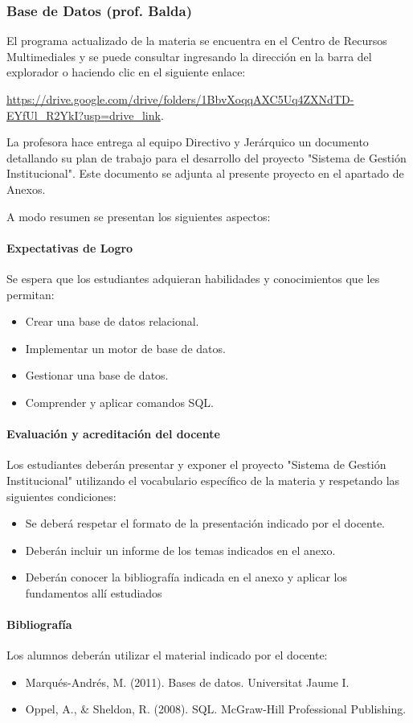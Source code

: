 \subsubsection{Base de Datos (prof. Balda)}       

El programa actualizado de la materia se encuentra en el Centro de Recursos Multimediales y se puede consultar ingresando la dirección en la barra del explorador o haciendo clic en el siguiente enlace:

\url{https://drive.google.com/drive/folders/1BbvXoqqAXC5Uq4ZXNdTD-EYfUl_R2YkI?usp=drive_link}.

La profesora hace entrega al equipo Directivo y Jerárquico un documento detallando su plan de trabajo para el desarrollo del proyecto "Sistema de Gestión Institucional". Este documento se adjunta al presente proyecto en el apartado de Anexos.

A modo resumen se presentan los siguientes aspectos:
\paragraph{Expectativas de Logro}
Se espera que los estudiantes adquieran habilidades y conocimientos que les permitan: 
\begin{itemize}
    \item Crear una base de datos relacional.
    \item Implementar un motor de base de datos.
    \item Gestionar una base de datos.
    \item Comprender y aplicar comandos SQL. 
\end{itemize}


\paragraph{Evaluación y acreditación del docente}
Los estudiantes deberán presentar y exponer el proyecto "Sistema de Gestión Institucional" utilizando el vocabulario específico de la materia y respetando las siguientes condiciones:
\begin{itemize}
    \item Se deberá respetar el formato de la presentación indicado por el docente.
    \item Deberán incluir un informe de los temas indicados en el anexo.
    \item Deberán conocer la bibliografía indicada en el anexo y aplicar los fundamentos allí estudiados
\end{itemize}
\paragraph{Bibliografía} Los alumnos deberán utilizar el material indicado por el docente:
\begin{itemize}
    \item Marqués-Andrés, M. (2011). Bases de datos. Universitat Jaume I.
    \item  Oppel, A., \& Sheldon, R. (2008). SQL. McGraw-Hill Professional Publishing.
\end{itemize}
